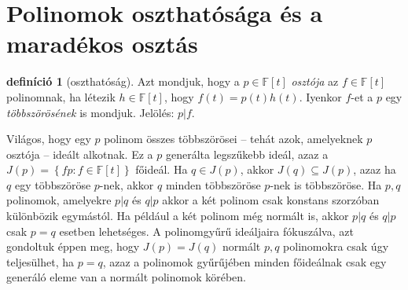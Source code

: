 \documentclass[9pt,showtrims]{memoir}
\theoremstyle{plain}
\theoremstyle{remark}
\theoremstyle{definition}
\newtheorem{definition}[proposition]{definíció}
\begin{document}
\section{Polinomok oszthatósága és a maradékos osztás}
\begin{definition}[oszthatóság]
        Azt mondjuk, hogy a $p\in\mathbb{F}\left[ t \right]$ \emph{osztója} az $f\in\mathbb{F}\left[ t \right]$ polinomnak,
        ha létezik $h\in\mathbb{F}\left[ t \right]$, hogy $f\left( t \right)=p\left( t \right)h\left( t \right)$.
        Iyenkor $f$-et a $p$ egy \emph{többszörösének} is mondjuk.
        Jelölés: $p|f$.
\end{definition}
Világos, hogy egy $p$ polinom összes többszörösei -- tehát azok, amelyeknek $p$ osztója --
ideált alkotnak. 
Ez a $p$ generálta legszűkebb ideál, azaz  a $J(p)=\left\{ fp:f\in\mathbb{F}\left[ t \right] \right\}$ főideál.
Ha $q\in J\left( p \right)$, akkor $J\left( q \right)\subseteq J\left( p \right)$, azaz ha $q$ egy többszöröse $p$-nek,
akkor $q$ minden többszöröse $p$-nek is többszöröse.
Ha $p,q$ polinomok, 
amelyekre $p|q$ és $q|p$ akkor a két polinom csak konstans szorzóban különbözik egymástól.
Ha például a két polinom még normált is, akkor $p|q$ és $q|p$ csak $p=q$ esetben lehetséges.
A polinomgyűrű ideáljaira fókuszálva, azt gondoltuk éppen meg, 
hogy $J\left( p \right)=J\left( q \right)$ normált $p,q$ polinomokra csak úgy teljesülhet, ha $p=q$,
azaz a polinomok gyűrűjében minden főideálnak csak egy generáló eleme van a normált polinomok körében.
\end{document}
